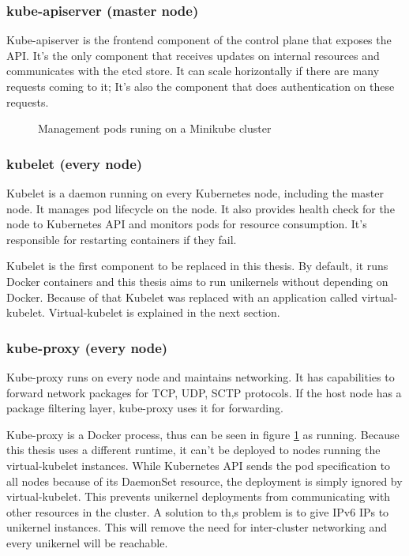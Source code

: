   \subsubsection*{kube-apiserver (master node)}

  Kube-apiserver is the frontend component of the control plane that exposes the API. It's the only component that receives updates on internal resources and communicates with the etcd store. It can scale horizontally if there are many requests coming to it; It's also the component that does authentication on these requests.
  \begin{figure}[htpb]
    \centering
    \caption{Management pods runing on a Minikube cluster}\label{fig:minikupods}
  \end{figure}
  
  \subsubsection*{kubelet (every node)}
  Kubelet is a daemon running on every Kubernetes node, including the master node. It manages pod lifecycle on the node. It also provides health check for the node to Kubernetes API and monitors pods for resource consumption. It's responsible for restarting containers if they fail.

  Kubelet is the first component to be replaced in this thesis. By default, it runs Docker containers and this thesis aims to run unikernels without depending on Docker. Because of that Kubelet was replaced with an application called virtual-kubelet. Virtual-kubelet is explained in the next section.
  \subsubsection*{kube-proxy (every node)}
  Kube-proxy runs on every node and maintains networking. It has capabilities to forward network packages for TCP, UDP, SCTP protocols. If the host node has a package filtering layer, kube-proxy uses it for forwarding.

  Kube-proxy is a Docker process, thus can be seen in figure \ref{fig:minikupods} as running. Because this thesis uses a different runtime, it can't be deployed to nodes running the virtual-kubelet instances. While Kubernetes API sends the pod specification to all nodes because of its DaemonSet resource, the deployment is simply ignored by virtual-kubelet. This prevents unikernel deployments from communicating with other resources in the cluster. A solution to th,s problem is to give IPv6 IPs to unikernel instances. This will remove the need for inter-cluster networking and every unikernel will be reachable.

